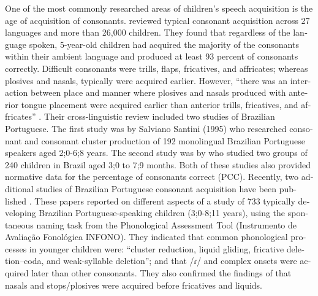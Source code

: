 \documentclass[output=paper,colorlinks,citecolor=brown]{langscibook}
\begin{document}
\begin{otherlanguage}{english}
One of the most commonly researched areas of children’s speech acquisition is the age of acquisition of consonants. \citet{McLeod2018a} reviewed typical consonant acquisition across 27 languages and more than 26,000 children. They found that regardless of the language spoken, 5-year-old children had acquired the majority of the consonants within their ambient language and produced at least 93 percent of consonants correctly. Difficult consonants were trills, flaps, fricatives, and affricates; whereas plosives and nasals, typically were acquired earlier. However, “there was an interaction between place and manner where plosives and nasals produced with anterior tongue placement were acquired earlier than anterior trills, fricatives, and affricates” \citep[1546]{McLeod2018a}. Their cross-linguistic review included two studies of Brazilian Portuguese. The first study was by Salviano Santini (1995) who researched consonant and consonant cluster production of 192 monolingual Brazilian Portuguese speakers aged 2;0-6;8 years. The second study was by \citet{Silva2012} who studied two groups of 240 children in Brazil aged 3;0 to 7;9 months. Both of these studies also provided normative data for the percentage of consonants correct (PCC). Recently, two additional studies of Brazilian Portuguese consonant acquisition have been published \citep{Ceron2017, Ceron2020}. These papers reported on different aspects of a study of 733 typically developing Brazilian Portuguese-speaking children (3;0-8;11 years), using the spontaneous naming task from the Phonological Assessment Tool (Instrumento de Avaliação Fonológica INFONO). They indicated that common phonological processes in younger children were: “cluster reduction, liquid gliding, fricative deletion–coda, and weak-syllable deletion”; and that /ɾ/ and complex onsets were acquired later than other consonants. They also confirmed the findings of \citet{McLeod2018a} that nasals and stops/plosives were acquired before fricatives and liquids. 



\end{otherlanguage}
\end{document}
